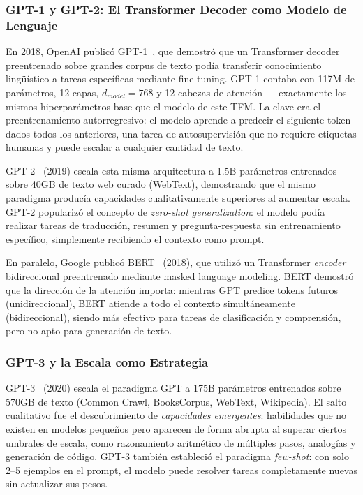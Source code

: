 \subsubsection{GPT-1 y GPT-2: El Transformer Decoder como Modelo de Lenguaje}

En 2018, OpenAI publicó GPT-1~\cite{radford2018gpt1}, que demostró que un Transformer decoder preentrenado sobre grandes corpus de texto podía transferir conocimiento lingüístico a tareas específicas mediante fine-tuning. GPT-1 contaba con 117M de parámetros, 12 capas, $d_{model}=768$ y 12 cabezas de atención --- exactamente los mismos hiperparámetros base que el modelo de este TFM. La clave era el preentrenamiento autorregresivo: el modelo aprende a predecir el siguiente token dados todos los anteriores, una tarea de autosupervisión que no requiere etiquetas humanas y puede escalar a cualquier cantidad de texto.

GPT-2~\cite{radford2019gpt2} (2019) escala esta misma arquitectura a 1.5B parámetros entrenados sobre 40GB de texto web curado (WebText), demostrando que el mismo paradigma producía capacidades cualitativamente superiores al aumentar escala. GPT-2 popularizó el concepto de \textit{zero-shot generalization}: el modelo podía realizar tareas de traducción, resumen y pregunta-respuesta sin entrenamiento específico, simplemente recibiendo el contexto como prompt.

En paralelo, Google publicó BERT~\cite{devlin2018bert} (2018), que utilizó un Transformer \textit{encoder} bidireccional preentrenado mediante masked language modeling. BERT demostró que la dirección de la atención importa: mientras GPT predice tokens futuros (unidireccional), BERT atiende a todo el contexto simultáneamente (bidireccional), siendo más efectivo para tareas de clasificación y comprensión, pero no apto para generación de texto.

\subsubsection{GPT-3 y la Escala como Estrategia}

GPT-3~\cite{brown2020gpt3} (2020) escala el paradigma GPT a 175B parámetros entrenados sobre 570GB de texto (Common Crawl, BooksCorpus, WebText, Wikipedia). El salto cualitativo fue el descubrimiento de \textit{capacidades emergentes}: habilidades que no existen en modelos pequeños pero aparecen de forma abrupta al superar ciertos umbrales de escala, como razonamiento aritmético de múltiples pasos, analogías y generación de código. GPT-3 también estableció el paradigma \textit{few-shot}: con solo 2--5 ejemplos en el prompt, el modelo puede resolver tareas completamente nuevas sin actualizar sus pesos.

